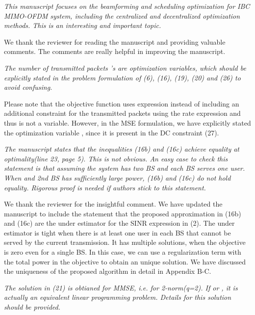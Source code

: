 \textit{This manuscript focuses on the beamforming and scheduling optimization for IBC MIMO-OFDM system, including the centralized and decentralized optimization methods. This is an interesting and important topic.}

We thank the reviewer for reading the manuscript and providing valuable comments. The comments are really helpful in improving the manuscript.

\begin{itemize}

 \textit{The number of transmitted packets 's are optimization variables, which should be explicitly stated in the problem formulation of (6), (16), (19), (20) and (26) to avoid confusing.}

\resp Please note that the objective function uses  expression instead of including an additional constraint for the transmitted packets using the rate expression and thus  is not a variable. However, in the MSE formulation, we have explicitly stated the optimization variable , since it is present in the DC constraint (27).

 \textit{The manuscript states that the inequalities (16b) and (16c) achieve equality at optimality(line 23, page 5). This is not obvious. An easy case to check this statement is that assuming the system has two BS and each BS serves one user. When  and 2nd BS has sufficiently large power, (16b) and (16c) do not hold equality. Rigorous proof is needed if authors stick to this statement.}

\resp We thank the reviewer for the insightful comment. We have updated the manuscript to include the statement that the proposed approximation in (16b) and (16c) are the under estimator for the SINR expression in (2). The under estimator is tight when there is at least one user in each BS that cannot be served by the current transmission. It has multiple solutions, when the objective is zero even for a single BS. In this case, we can use a regularization term with the total power in the objective to obtain an unique solution. We have discussed the uniqueness of the proposed algorithm in detail in Appendix B-C.

 \textit{The solution in (21) is obtianed for MMSE, i.e. for 2-norm(q=2). If  or , it is actually an equivalent linear programming problem. Details for this solution should be provided.}


\end{itemize}
